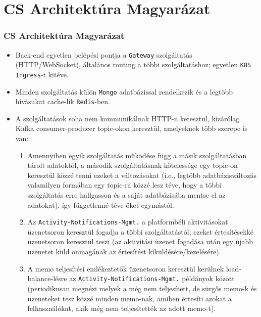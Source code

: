 \section{CS Architektúra Magyarázat}

\begin{frame}
    \frametitle{CS Architektúra Magyarázat}

    \begin{itemize}
        \item Back-end egyetlen belépési pontja a \texttt{Gateway} szolgáltatás (HTTP/WebSocket), általános routing a többi szolgáltatáshoz; egyetlen \texttt{K8S Ingress}-t kitéve.
        \item Minden szolgáltatás külön \texttt{Mongo} adatbázissal rendelkezik és a legtöbb hívásukat cache-lik \texttt{Redis}-ben.
        \item A szolgáltatások soha nem kommunikálnak HTTP-n keresztül, kizárólag Kafka consumer-producer topic-okon keresztül, amelyeknek több szerepe is van:
              \begin{enumerate}
                  \item Amennyiben egyik szolgáltatás működése függ a másik szolgáltatásban tárolt adatoktól, a második szolgáltatásnak kötelessége egy topic-on keresztül közzé tenni ezeket a változásokat (i.e., legtöbb adatbázisváltozás valamilyen formában egy topic-ra közzé lesz téve, hogy a többi szolgáltatás erre hallgasson és a saját adatbázisába mentse el az adatokat), így függetlenné téve őket egymástól.
                  \item Az \texttt{Activity-Notifications-Mgmt.} a platformbéli aktivitásokat üzenetsoron keresztül fogadja a többi szolgáltatástól, ezeket értesítésekké üzenetsoron keresztül teszi (az aktivitási üzenet fogadása után egy újabb üzenetet küld önmagának az értesítést kiküldésére/kezelésére).
                  \item A memo teljesítési emlékeztetők üzenetsoron keresztül kerülnek load-balance-lésre az \texttt{Activity-Notifications-Mgmt.} példányok között (periodikusan megnézi melyek a még nem teljesített, de sürgős memo-k és üzeneteket tesz közzé minden memo-nak, amiben értesíti azokat a felhasználókat, akik még nem teljesítették az adott memo-t).
              \end{enumerate}
    \end{itemize}
\end{frame}

